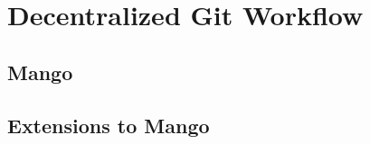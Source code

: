 \section{Decentralized Git Workflow}
\label{sec:git}

\subsection{Mango}

\subsection{Extensions to Mango}

